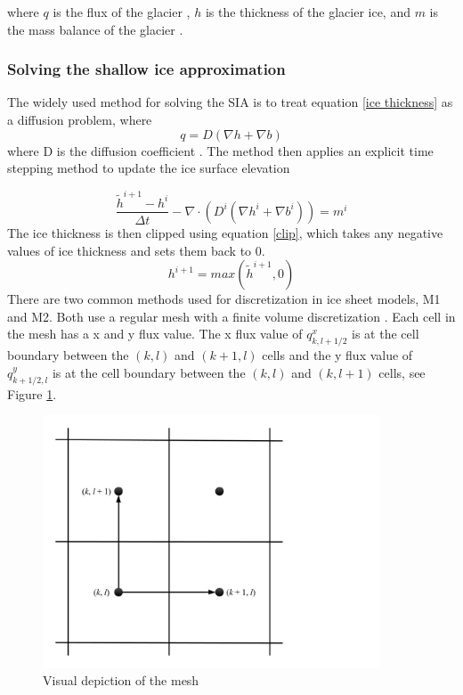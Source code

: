 \documentclass{article}
\begin{document}
where $q$ is the flux of the glacier , $h$ is the thickness of the glacier ice, and $m$ is the mass balance of the glacier \citep{Jarosch2013,Greve2009}.
\subsubsection{Solving the shallow ice approximation}
The widely used method for solving the SIA is to treat equation \ref{ice thickness} as a diffusion problem, where 
\begin{equation} \label{diffusion1}
    q= D(\nabla h + \nabla b)
\end{equation}
where D is the diffusion coefficient \cite{Jarosch2013}. The method then applies an explicit time stepping method to update the ice surface elevation

\begin{equation} \label{timestep}
\frac{\tilde{h}^{i+1}-h^i}{\Delta t} - \nabla \cdot (D^i (\nabla h^{i} + \nabla b^{i})) = m^i
\end{equation}
The ice thickness is then clipped using equation \ref{clip}, which takes any negative values of ice thickness and sets them back to 0. 
\begin{equation}\label{clip}
h^{i+1}=max(\tilde{h}^{i+1},0)
\end{equation}
There are two common methods used for discretization in ice sheet models, M1 and M2. Both use a regular mesh with a finite volume discretization \cite{Jarosch2013,Hindmarsh1996,Huybrechts1996}.  Each cell in the mesh has a x and y flux value. The x flux value of $q^x_{k, l+1/2}$  is at the cell boundary between the $(k,l)$ and $(k+1,l) $ cells and the y flux value of $q^y_{k+1/2, l}$ is at the cell boundary between the $(k,l)$ and $(k,l+1)$ cells, see Figure \ref{fig:Grid}. 
\begin{figure}[H]
    \centering
    \includegraphics[width=10cm]{Grid.jpg}
    \caption{Visual depiction of the mesh}
    \label{fig:Grid}
\end{figure}
\end{document}
